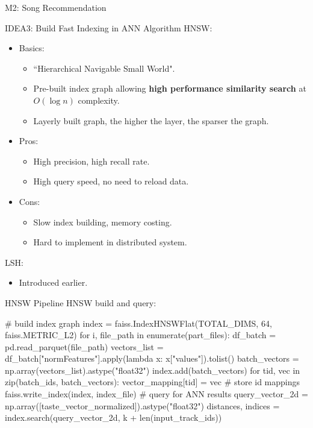 \documentclass{beamer}
\begin{document}
\begin{section}{M2: Song Recommendation}
    \begin{frame}{IDEA3: Build Fast Indexing in ANN Algorithm}
        HNSW:
        \begin{itemize}
            \item Basics:
                \begin{itemize}
                    \item ``Hierarchical Navigable Small World".
                    \item Pre-built index graph allowing \textbf{high performance similarity search} at $O(\log n)$ complexity.
                    \item Layerly built graph, the higher the layer, the sparser the graph.
                \end{itemize}
            \item Pros:
                \begin{itemize}
                    \item High precision, high recall rate.
                    \item High query speed, no need to reload data.
                \end{itemize}
            \item Cons:
                \begin{itemize}
                    \item Slow index building, memory costing.
                    \item Hard to implement in distributed system.
                \end{itemize}
        \end{itemize}
        LSH:
            \begin{itemize}
                \item Introduced earlier.
            \end{itemize}
    \end{frame}
    \begin{frame}[fragile]{HNSW Pipeline}
    HNSW build and query:
        \begin{mycodepython}
# build index graph
index = faiss.IndexHNSWFlat(TOTAL_DIMS, 64, faiss.METRIC_L2)
for i, file_path in enumerate(part_files):
    df_batch = pd.read_parquet(file_path)
    vectors_list = df_batch["normFeatures"].apply(lambda x: x["values"]).tolist()
    batch_vectors = np.array(vectors_list).astype("float32")
    index.add(batch_vectors)
    for tid, vec in zip(batch_ids, batch_vectors):
        vector_mapping[tid] = vec # store id mappings
faiss.write_index(index, index_file)
# query for ANN results
query_vector_2d = np.array([taste_vector_normalized]).astype("float32")
distances, indices = index.search(query_vector_2d, k + len(input_track_ids))
        \end{mycodepython}
    \end{frame}


\end{section}
\end{document}
